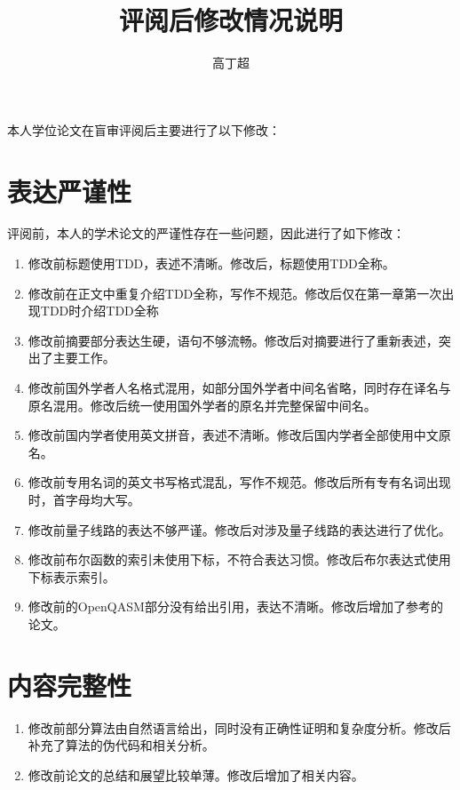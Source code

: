 \documentclass[10.5pt]{article} %
\title{评阅后修改情况说明} %
\author{高丁超} %
\date{} %
\begin{document}
\maketitle %
\thispagestyle{empty}

本人学位论文在盲审评阅后主要进行了以下修改：
\section*{表达严谨性}
评阅前，本人的学术论文的严谨性存在一些问题，因此进行了如下修改：
\begin{enumerate}
    \item 修改前标题使用TDD，表述不清晰。修改后，标题使用TDD全称。
    \item 修改前在正文中重复介绍TDD全称，写作不规范。修改后仅在第一章第一次出现TDD时介绍TDD全称
    \item 修改前摘要部分表达生硬，语句不够流畅。修改后对摘要进行了重新表述，突出了主要工作。
    \item 修改前国外学者人名格式混用，如部分国外学者中间名省略，同时存在译名与原名混用。修改后统一使用国外学者的原名并完整保留中间名。
    \item 修改前国内学者使用英文拼音，表述不清晰。修改后国内学者全部使用中文原名。
    \item 修改前专用名词的英文书写格式混乱，写作不规范。修改后所有专有名词出现时，首字母均大写。
    \item 修改前量子线路的表达不够严谨。修改后对涉及量子线路的表达进行了优化。
    \item 修改前布尔函数的索引未使用下标，不符合表达习惯。修改后布尔表达式使用下标表示索引。
    \item 修改前的OpenQASM部分没有给出引用，表达不清晰。修改后增加了参考的论文。
\end{enumerate}
\section*{内容完整性}
\begin{enumerate}
    \item 修改前部分算法由自然语言给出，同时没有正确性证明和复杂度分析。修改后补充了算法的伪代码和相关分析。
    \item 修改前论文的总结和展望比较单薄。修改后增加了相关内容。
\end{enumerate}
\end{document}
